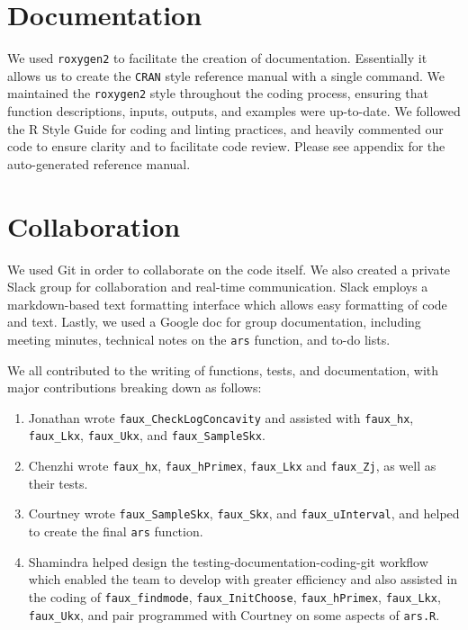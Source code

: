 \documentclass{article}\usepackage[]{graphicx}\usepackage[]{color}
\begin{document}
\section{Documentation}

We used \texttt{roxygen2} to facilitate the creation of documentation. 
Essentially it allows us to create the \texttt{CRAN} style reference manual with 
a single command. We maintained the \texttt{roxygen2} style throughout the coding process, 
ensuring that function descriptions, inputs, outputs, and examples were up-to-date.
We followed the R Style Guide for coding and linting practices,
and heavily commented our code to ensure clarity and to facilitate code
review. Please see appendix for the auto-generated reference manual.

\section{Collaboration}

We used Git in order to collaborate on the code itself. We also created a
private Slack group for collaboration and real-time communication.
Slack employs a markdown-based text formatting interface which allows
easy formatting of code and text.
Lastly, we used a Google doc for group documentation, including
meeting minutes, technical notes on the \texttt{ars} function,
and to-do lists.

We all contributed to the writing of functions, tests, and documentation,
with major contributions breaking down as follows:
\begin{enumerate}
	\item Jonathan wrote \texttt{faux\_CheckLogConcavity} and assisted with
	\texttt{faux\_hx}, \texttt{faux\_Lkx}, \texttt{faux\_Ukx}, and
	\texttt{faux\_SampleSkx}.
	\item Chenzhi wrote \texttt{faux\_hx}, \texttt{faux\_hPrimex}, \texttt{faux\_Lkx}    and \texttt{faux\_Zj}, as well as their tests.
	\item Courtney wrote \texttt{faux\_SampleSkx}, \texttt{faux\_Skx}, and
	\texttt{faux\_uInterval}, and helped to create the final \texttt{ars} function.
	\item Shamindra helped design the testing-documentation-coding-git workflow
    which enabled the team to develop with greater efficiency and also assisted 
    in the coding of \texttt{faux\_findmode}, \texttt{faux\_InitChoose}, \texttt{faux\_hPrimex}, 
    \texttt{faux\_Lkx}, \texttt{faux\_Ukx}, and pair programmed with Courtney on some aspects of \texttt{ars.R}.
\end{enumerate}
\end{document}
